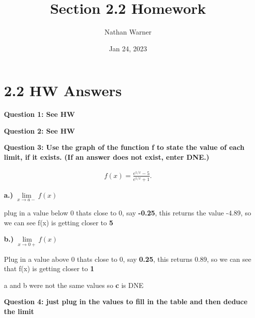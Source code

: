 \documentclass{report}
\title{\Huge{Section 2.2 Homework}}
\author{\huge{Nathan Warner}}
\date{\huge{Jan 24, 2023}}
\begin{document}
    \maketitle
    \section{\Large{2.2 HW Answers}}
    
    \bigbreak \noindent \bigbreak \noindent 
    \begin{large}
       \noindent \textbf{Question 1: See HW } 
    \end{large}

    \bigbreak \noindent \bigbreak \noindent  
    \begin{large}
        \noindent \textbf{Question 2: See HW}
    \end{large}

    \bigbreak \noindent \bigbreak \noindent  
    \begin{large}
       \textbf{Question 3: Use the graph of the function f to state the value of each limit, if it exists. (If an answer does not exist, enter DNE.)} 
    \end{large}

    \bigbreak \noindent 
    \begin{large}
        \begin{align*}
            f \left(x\right) = \frac{e^{1/x}-5}{e^{1/x}+1}
        .\end{align*}
    \end{large}
    
    
    \bigbreak \noindent 
        
    \bigbreak \noindent 
    \begin{large}
        \textbf{a.)} $\lim\limits_{x \to a-}{f \left(x\right)}$
    \end{large}
    
    \bigbreak plug in a value below 0 thats close to 0, say \textbf{-0.25}, this returns the value
    -4.89, so we can see f(x) is getting closer to \textbf{5}

    \bigbreak \noindent \bigbreak \noindent  
    \begin{large}
        \textbf{b.)} $\lim\limits_{x \to 0+}{f \left(x\right)}$ 
    \end{large}

    \bigbreak \noindent 
    Plug in a value above 0 thats close to 0, say \textbf{0.25}, this returns 0.89, so we
    can see that f(x) is getting closer to \textbf{1}
    
    \bigbreak \noindent \bigbreak \noindent 
    a and b were not the same values so \textbf{c} is DNE
     
    \bigbreak \noindent \bigbreak \noindent 
    \begin{large}
       \textbf{Question 4: just plug in the values to fill in the table and then deduce the limit} 
    \end{large}
    
\end{document}
